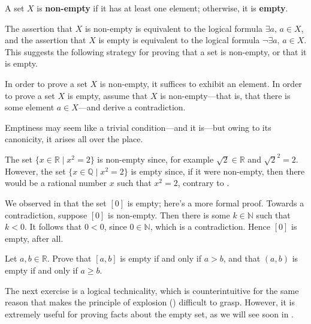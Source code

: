 \begin{definition}
\label{defInhabited}
\label{defEmptyProperty}
A set $X$ is \textbf{non-empty} if it has at least one element; otherwise, it is \textbf{empty}.
\end{definition}

The assertion that $X$ is non-empty is equivalent to the logical formula $\exists a,\, a \in X$, and the assertion that $X$ is empty is equivalent to the logical formula $\neg \exists a,\, a \in X$. This suggests the following strategy for proving that a set is non-empty, or that it is empty.

\begin{strategy}
In order to prove a set $X$ is non-empty, it suffices to exhibit an element. In order to prove a set $X$ is empty, assume that $X$ is non-empty---that is, that there is some element $a \in X$---and derive a contradiction.
\end{strategy}

Emptiness may seem like a trivial condition---and it is---but owing to its canonicity, it arises all over the place.

\begin{example}
The set $\{ x \in \mathbb{R} \mid x^2 = 2 \}$ is non-empty since, for example $\sqrt{2} \in \mathbb{R}$ and $\sqrt{2}^2 = 2$. However, the set $\{ x \in \mathbb{Q} \mid x^2 = 2 \}$ is empty since, if it were non-empty, then there would be a rational number $x$ such that $x^2 = 2$, contrary to .
\end{example}

\begin{example}
We observed in  that the set $[0]$ is empty; here's a more formal proof. Towards a contradiction, suppose $[0]$ is non-empty. Then there is some $k \in \mathbb{N}$ such that $k < 0$. It follows that $0 < 0$, since $0 \in \mathbb{N}$, which is a contradiction. Hence $[0]$ is empty, after all.
\end{example}

\begin{exercise}
Let $a,b \in \mathbb{R}$. Prove that $[a,b]$ is empty if and only if $a > b$, and that $(a,b)$ is empty if and only if $a \ge b$.
\end{exercise}

The next exercise is a logical technicality, which is counterintuitive for the same reason that makes the principle of explosion () difficult to grasp. However, it is extremely useful for proving facts about the empty set, as we will see soon in .

